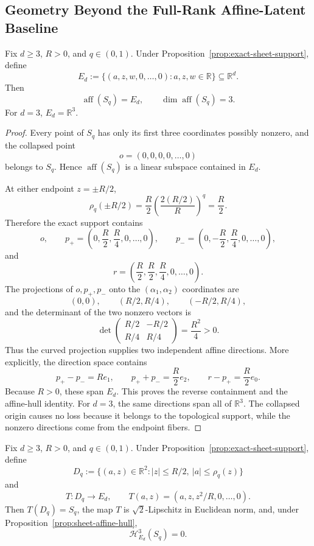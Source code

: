 \subsection{Geometry Beyond the Full-Rank Affine-Latent Baseline}
\label{app:affine-exclusion}

\begin{proposition}
\label{prop:sheet-affine-hull}
Fix $d\geq3$, $R>0$, and $q\in(0,1)$.  Under
Proposition~\ref{prop:exact-sheet-support}, define
\[
E_d:=\{(a,z,w,0,\ldots,0):a,z,w\in\mathbb R\}
\subseteq\mathbb R^d.
\]
Then
\[
\operatorname{aff}(S_q)=E_d,
\qquad
\dim\operatorname{aff}(S_q)=3.
\]
For $d=3$, $E_d=\mathbb R^3$.
\end{proposition}

\begin{proof}
Every point of $S_q$ has only its first three coordinates possibly
nonzero, and the collapsed point
\[
o=(0,0,0,0,\ldots,0)
\]
belongs to $S_q$.  Hence $\operatorname{aff}(S_q)$ is a linear subspace
contained in $E_d$.

At either endpoint $z=\pm R/2$,
\[
\rho_q(\pm R/2)
=\frac R2\left(\frac{2(R/2)}R\right)^q
=\frac R2.
\]
Therefore the exact support contains
\[
o,
\qquad
p_+=\left(0,\frac R2,\frac R4,0,\ldots,0\right),
\qquad
p_-=\left(0,-\frac R2,\frac R4,0,\ldots,0\right),
\]
and
\[
r=\left(\frac R2,\frac R2,\frac R4,0,\ldots,0\right).
\]
The projections of $o,p_+,p_-$ onto the
$(\alpha_1,\alpha_2)$ coordinates are
\[
(0,0),\qquad(R/2,R/4),\qquad(-R/2,R/4),
\]
and the determinant of the two nonzero vectors is
\[
\det\begin{pmatrix}R/2&-R/2\\R/4&R/4\end{pmatrix}
=\frac{R^2}{4}>0.
\]
Thus the curved projection supplies two independent affine directions.
More explicitly, the direction space contains
\[
p_+-p_-=Re_1,
\qquad
p_++p_-=\frac R2e_2,
\qquad
r-p_+=\frac R2e_0.
\]
Because $R>0$, these span $E_d$.  This proves the reverse containment and
the affine-hull identity.  For $d=3$, the same directions span all of
$\mathbb R^3$.  The collapsed origin causes no loss because it belongs
to the topological support, while the nonzero directions come from the
endpoint fibers.
\end{proof}

\begin{proposition}
\label{prop:sheet-null-volume}
Fix $d\geq3$, $R>0$, and $q\in(0,1)$.  Under
Proposition~\ref{prop:exact-sheet-support}, define
\[
D_q:=\{(a,z)\in\mathbb R^2:|z|\leq R/2,
\ |a|\leq\rho_q(z)\}
\]
and
\[
T:D_q\longrightarrow E_d,
\qquad
T(a,z)=(a,z,z^2/R,0,\ldots,0).
\]
Then $T(D_q)=S_q$, the map $T$ is $\sqrt2$-Lipschitz in Euclidean norm,
and, under Proposition~\ref{prop:sheet-affine-hull},
\[
\mathcal H^3_{E_d}(S_q)=0.
\]
\end{proposition}

